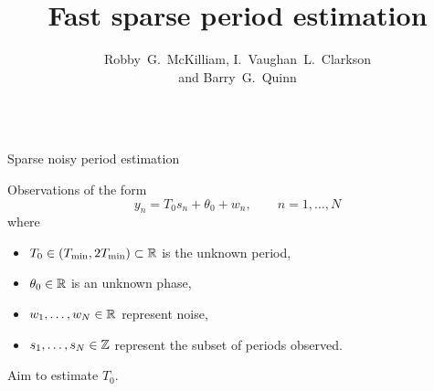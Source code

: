 \documentclass[final,hyperref={pdfpagelabels=false}]{beamer}
\title[]{Fast sparse period estimation}
\author{Robby~G.~McKilliam, I.~Vaughan~L.~Clarkson \\ and Barry~G.~Quinn}
\begin{document}


\begin{columns}[t] %
\begin{column}{.49\textwidth} %

\newcommand{\Tmin}{T_{\text{min}}}
\newcommand{\Tmax}{2T_{\text{min}}}

\begin{block}{Sparse noisy period estimation}

Observations of the form
\[
y_n = T_0 s_n + \theta_0 + w_n, \qquad n = 1,\dots,N
\]
where
\begin{itemize}
\item $T_0 \in (\Tmin, \Tmax) \subset \reals$ is the unknown period,
\item $\theta_0 \in {\mathbb R}$ is an unknown phase,
\item $w_1,\dots,w_N \in {\mathbb R}$ represent noise,
\item $s_1,\dots,s_N \in {\mathbb Z}$ represent the subset of periods observed.
\end{itemize}

Aim to estimate $T_0$.

{
\def\vertgap{2}
\def\ph{0.4}
\def\T{1.1}

\newcommand{\raxis}{\draw[-> new,arrow head=2mm] (-0.25,0) -- (8,0) node[above] {$\reals$}; \draw (0,-0.06)-- node[below] {$0$} (0,0.06) }
\newcommand{\pulse}[1]{ \draw[-latex new,arrow head=4mm] (#1,0) -- (#1,1) }
\newcommand{\pulsewithnode}[2]{ \draw[-latex new,arrow head=4mm] (#1,0) -- node[right] {#2} (#1,1) }
\begin{figure}[t]
	\centering
{} 
		\label{fig_stat_model}
\end{figure}
}



\end{block}
\end{column}
\end{columns}
\end{document}

